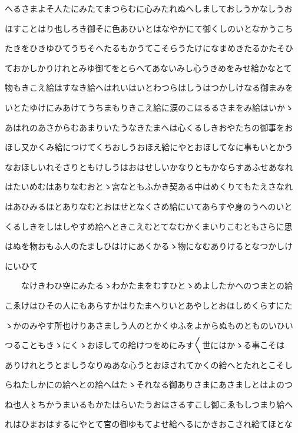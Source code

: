 \documentclass[a4paper,11pt,landscape]{ltjtarticle}
\begin{document}
へるさまよそ人たにみたてまつらむに心みたれぬへしましておしうかなしうお
\par\medskip
ほすことはり也しろき御そに色あひいとはなやかにて御くしのいとなかうこち
\par\medskip
たきをひきゆひてうちそへたるもかうてこそらうたけになまめきたるかたそひ
\par\medskip
ておかしかりけれとみゆ御てをとらへてあないみし心うきめをみせ給かなとて
\par\medskip
物もきこえ給はすなき給へはれいはいとわつらはしうはつかしけなる御まみを
\par\medskip
いとたゆけにみあけてうちまもりきこえ給に涙のこほるるさまをみ給はいかゝ
\par\medskip
あはれのあさからむあまりいたうなきたまへは心くるしきおやたちの御事をお
\par\medskip
ほし又かくみ給につけてくちおしうおほえ給にやとおほしてなに事もいとかう
\par\medskip
なおほしいれそさりともけしうはおはせしいかなりともかならすあふせあなれ
\par\medskip
はたいめむはありなむおとゝ宮なともふかき契ある中はめくりてもたえさなれ
\par\medskip
はあひみるほとありなむとおほせとなくさめ給にいてあらすや身のうへのいと
\par\medskip
くるしきをしはしやすめ給へときこえむとてなむかくまいりこむともさらに思
\par\medskip
はぬを物おもふ人のたましひはけにあくかるゝ物になむありけるとなつかしけ
\par\medskip
にいひて
\par\medskip
　　なけきわひ空にみたるゝわかたまをむすひとゝめよしたかへのつまとの給
\par\medskip
こゑけはひその人にもあらすかはりたまへりいとあやしとおほしめくらすにた
\par\medskip
ゝかのみやす所也けりあさましう人のとかくゆふをよからぬものとものいひい
\par\medskip
つることもきゝにくゝおほしての給けつをめにみす〱世にはかゝる事こそは
\par\medskip
ありけれとうとましうなりぬあな心うとおほされてかくの給へとたれとこそし
\par\medskip
らねたしかにの給へとの給へはたゝそれなる御ありさまにあさましとはよのつ
\par\medskip
ね也人〻ちかうまいるもかたはらいたうおほさるすこし御こゑもしつまり給へ
\par\medskip
れはひまおはするにやとて宮の御ゆもてよせ給へるにかきおこされ給てほとな
\end{document}
